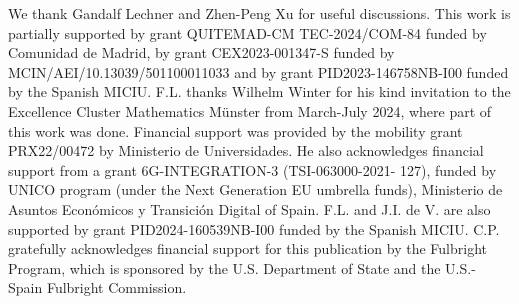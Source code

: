 \documentclass[a4paper,onecolumn,accepted=2024-12-14]{quantumarticle}
\theoremstyle{plain}
\begin{document}
\begin{acknowledgments}

We thank Gandalf Lechner and Zhen-Peng Xu for useful discussions. This work is partially supported by grant QUITEMAD-CM TEC-2024/COM-84 funded by Comunidad de Madrid, by grant CEX2023-001347-S funded by MCIN/AEI/10.13039/501100011033 and by grant PID2023-146758NB-I00 funded by the Spanish MICIU. F.L. thanks Wilhelm Winter for his kind invitation to the Excellence Cluster Mathematics M\"unster from March-July 2024, where part of this work was done.
Financial support was provided by the mobility grant PRX22/00472 by Ministerio de Universidades. He also acknowledges financial support from a grant 6G-INTEGRATION-3 (TSI-063000-2021-
127), funded by UNICO program (under the Next Generation EU umbrella funds), Ministerio de Asuntos Económicos y Transición Digital of Spain. F.L. and J.I. de V. are also supported by grant PID2024-160539NB-I00 funded by the Spanish MICIU. C.P. gratefully acknowledges financial support for this publication by the Fulbright Program, which is sponsored by the U.S. Department of State and the U.S.- Spain Fulbright Commission.

\end{acknowledgments}
\end{document}
